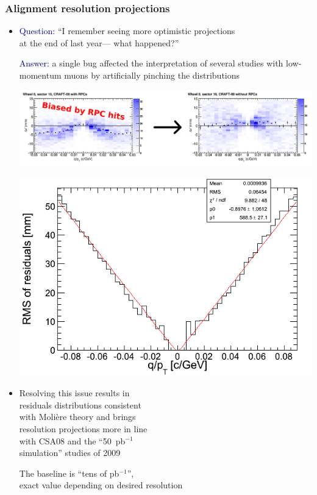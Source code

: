 \documentclass[compress]{beamer}
\begin{document}
\begin{frame}
\frametitle{Alignment resolution projections}
\begin{itemize}
\item \textcolor{darkblue}{Question:} ``I remember seeing more optimistic projections \\ at the end of last year--- what happened?''

\textcolor{darkblue}{Answer:} a single bug affected the interpretation
of several studies with low-momentum muons by artificially pinching
the distributions

\includegraphics[width=\linewidth]{rpcbiasfix.png}

\hfill \includegraphics[width=0.5\linewidth]{qoverpt_residualswidth.png}

\vspace{-3.5 cm}
\item Resolving this issue results in \\ residuals distributions
  consistent \\ with Moli\`ere theory and brings \\ resolution
  projections more in line \\ with CSA08 and the ``50~pb$^{-1}$ \\
  simulation'' studies of 2009

\vspace{0.1 cm}
The baseline is ``tens of pb$^{-1}$'', \\ exact value depending on desired resolution
\end{itemize}
\end{frame}
\end{document}
